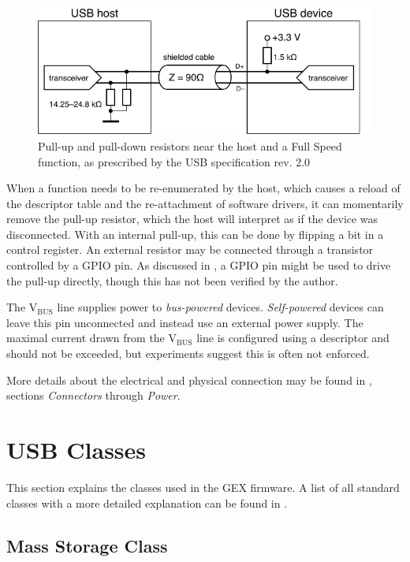 \begin{figure}[h]
	\centering
	\includegraphics[scale=1]{img/usb-resistors.pdf}
	\caption[USB pull-ups]{\label{fig:usb-pullup-fs}Pull-up and pull-down resistors near the host and a Full Speed function, as prescribed by the USB specification rev. 2.0}
\end{figure}

When a function needs to be re-enumerated by the host, which causes a reload of the descriptor table and the re-attachment of software drivers, it can momentarily remove the pull-up resistor, which the host will interpret as if the device was disconnected. With an internal pull-up, this can be done by flipping a bit in a control register. An external resistor may be connected through a transistor controlled by a \gls{GPIO} pin. As discussed in \cite{eev-gpio-pu}, a GPIO pin might be used to drive the pull-up directly, though this has not been verified by the author.

The V$_\mathrm{BUS}$ line supplies power to \textit{bus-powered} devices. \textit{Self-powered} devices can leave this pin unconnected and instead use an external power supply. The maximal current drawn from the V$_\mathrm{BUS}$ line is configured using a descriptor and should not be exceeded, but experiments suggest this is often not enforced.

\noindent More details about the electrical and physical connection may be found in \cite{usb-nutshell}, sections \textit{Connectors} through \textit{Power}. 

\section{USB Classes}

This section explains the classes used in the GEX firmware. A list of all standard classes with a more detailed explanation can be found in \cite{usb-class-list}.

\subsection{Mass Storage Class} \label{sec:msc}


